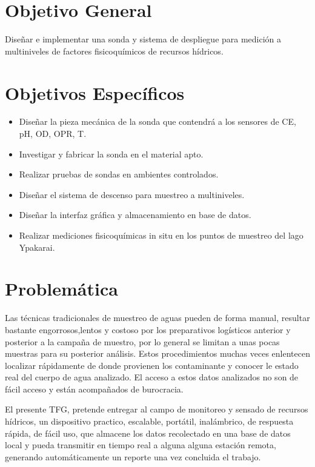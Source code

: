 \section{Objetivo General}
Diseñar e implementar una sonda y sistema de despliegue para medición a multiniveles de factores fisicoquímicos de recursos hídricos.


\section{Objetivos Específicos}
\begin{itemize}
	\item Diseñar la pieza mecánica de la sonda que contendrá a los sensores de CE, pH, OD, OPR, T.
    \item Investigar y fabricar  la sonda en el material apto.
    \item Realizar pruebas de sondas en ambientes controlados.
    \item Diseñar el sistema de descenso para muestreo a multiniveles.
    \item Diseñar la interfaz gráfica y almacenamiento en base de datos.  
    \item Realizar mediciones fisicoquímicas in situ en los puntos de muestreo del lago Ypakarai.

\end{itemize}

\section{Problemática} 

 Las técnicas tradicionales de muestreo  de aguas  pueden de forma manual, resultar bastante engorrosos,lentos y costoso por los preparativos logísticos anterior y posterior a la campaña de muestro, por lo general se limitan a unas pocas muestras para su posterior análisis. 
 Estos procedimientos muchas veces enlentecen localizar rápidamente de donde provienen los contaminante y conocer le estado real del cuerpo de agua analizado. El acceso a estos datos analizados no son de fácil acceso y están acompañados de burocracia.  


 
El presente TFG, pretende entregar al campo de monitoreo y sensado de recursos hídricos, un dispositivo practico, escalable, portátil, inalámbrico, de respuesta rápida, de fácil uso, que almacene los datos recolectado en una base de datos local y pueda transmitir en tiempo real a alguna alguna estación remota, generando automáticamente un reporte una vez concluida el trabajo. 

